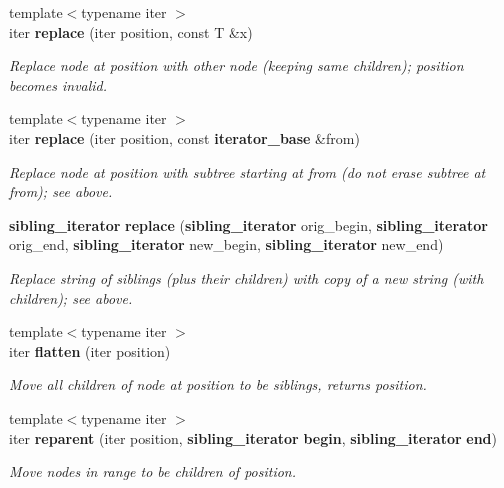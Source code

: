 \begin{DoxyCompactItemize}
{\footnotesize template$<$typename iter $>$ }\\iter {\bf replace} (iter position, const T \&x)
\begin{DoxyCompactList}\small\item\em Replace node at \textquotesingle{}position\textquotesingle{} with other node (keeping same children); \textquotesingle{}position\textquotesingle{} becomes invalid. \end{DoxyCompactList}\item 
{\footnotesize template$<$typename iter $>$ }\\iter {\bf replace} (iter position, const {\bf iterator\+\_\+base} \&from)
\begin{DoxyCompactList}\small\item\em Replace node at \textquotesingle{}position\textquotesingle{} with subtree starting at \textquotesingle{}from\textquotesingle{} (do not erase subtree at \textquotesingle{}from\textquotesingle{}); see above. \end{DoxyCompactList}\item 
{\bf sibling\+\_\+iterator} {\bf replace} ({\bf sibling\+\_\+iterator} orig\+\_\+begin, {\bf sibling\+\_\+iterator} orig\+\_\+end, {\bf sibling\+\_\+iterator} new\+\_\+begin, {\bf sibling\+\_\+iterator} new\+\_\+end)
\begin{DoxyCompactList}\small\item\em Replace string of siblings (plus their children) with copy of a new string (with children); see above. \end{DoxyCompactList}\item 
{\footnotesize template$<$typename iter $>$ }\\iter {\bf flatten} (iter position)
\begin{DoxyCompactList}\small\item\em Move all children of node at \textquotesingle{}position\textquotesingle{} to be siblings, returns position. \end{DoxyCompactList}\item 
{\footnotesize template$<$typename iter $>$ }\\iter {\bf reparent} (iter position, {\bf sibling\+\_\+iterator} {\bf begin}, {\bf sibling\+\_\+iterator} {\bf end})
\begin{DoxyCompactList}\small\item\em Move nodes in range to be children of \textquotesingle{}position\textquotesingle{}. \end{DoxyCompactList}\item 

\end{DoxyCompactItemize}
